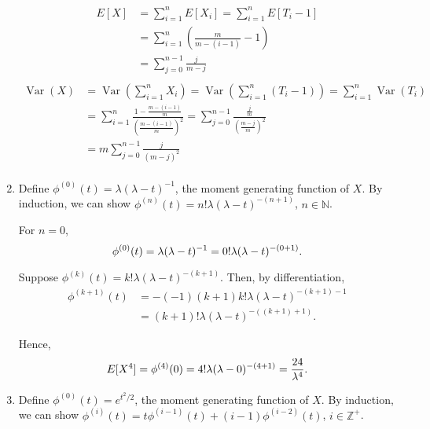 \documentclass{article}
\DeclareMathOperator{\Var}{Var}
\begin{document}
\begin{enumerate}
    \begin{equation*}\begin{split}
    E[X]    & = \sum_{i=1}^n E[X_i] = \sum_{i=1}^n E[T_i-1] \\
            & = \sum_{i=1}^n \left(\frac{m}{m-(i-1)} - 1\right) \\
            & = \sum_{j=0}^{n-1} \frac{j}{m-j} \\
    \end{split}\end{equation*}
    \begin{equation*}\begin{split}
    \Var(X) & = \Var\left( \sum_{i=1}^n X_i \right) = \Var\left( \sum_{i=1}^n (T_i-1) \right) = \sum_{i=1}^n \Var(T_i) \\
            & = \sum_{i=1}^n\frac{1-\frac{m-(i-1)}{m}}{\left(\frac{m-(i-1)}{m}\right)^2} = \sum_{j=0}^{n-1} \frac{\frac{j}{m}}{\left(\frac{m-j}{m}\right)^2} \\
            & = m\sum_{j=0}^{n-1} \frac{j}{(m-j)^2} \\
    \end{split}\end{equation*}
\item
    Define $\phi^{(0)}(t) = \lambda(\lambda-t)^{-1}$, the moment generating function of $X$.
    By induction, we can show $\phi^{(n)}(t) = n!\lambda(\lambda - t)^{-(n+1)}$, $n \in \mathbb{N}$.

    For $n=0$,
    \[
    \phi^{(0)}(t) = \lambda(\lambda - t)^{-1} = 0!\lambda(\lambda - t)^{-(0+1)} \text.
    \]

    Suppose $\phi^{(k)}(t) = k!\lambda(\lambda - t)^{ -(k+1) }$. Then, by differentiation,
    \[\begin{split}
    \phi^{(k+1)}(t) & = -(-1)(k+1)k!\lambda(\lambda - t)^{-(k+1)-1} \\
                  & = (k+1)!\lambda(\lambda - t)^{-((k+1)+1)}\text{.}
    \end{split}\]

    Hence,
    \[
    E[X^4] = \phi^{(4)}(0) = 4!\lambda(\lambda - 0)^{-(4+1)} = \frac{24}{\lambda^4} \text.
    \]
\item
    Define $\phi^{(0)}(t) = e^{t^2/2}$, the moment generating function of $X$.
    By induction, we can show $\phi^{(i)}(t) = t\phi^{(i-1)}(t) + (i-1)\phi^{(i-2)}(t)$, $i \in \mathbb{Z^+}$.


\end{enumerate}
\end{document}
